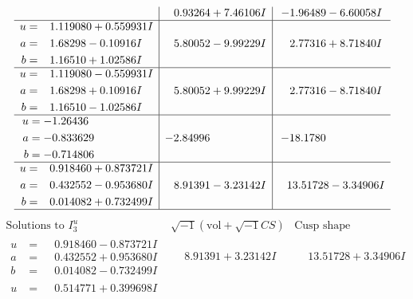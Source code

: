 \documentclass[1p]{elsarticle_modified}
\theoremstyle{definition}
\newcommand{\I}{\sqrt{-1}}
\begin{document}
$$\begin{array}{c|c|c}
 & \phantom{-}0.93264 + 7.46106 I & -1.96489 - 6.60058 I \\ \hline\begin{aligned}
u &= \phantom{-}1.119080 + 0.559931 I \\
a &= \phantom{-}1.68298 - 0.10916 I \\
b &= \phantom{-}1.16510 + 1.02586 I\end{aligned}
 & \phantom{-}5.80052 - 9.99229 I & \phantom{-}2.77316 + 8.71840 I \\ \hline\begin{aligned}
u &= \phantom{-}1.119080 - 0.559931 I \\
a &= \phantom{-}1.68298 + 0.10916 I \\
b &= \phantom{-}1.16510 - 1.02586 I\end{aligned}
 & \phantom{-}5.80052 + 9.99229 I & \phantom{-}2.77316 - 8.71840 I \\ \hline\begin{aligned}
u &= -1.26436\phantom{ +0.000000I} \\
a &= -0.833629\phantom{ +0.000000I} \\
b &= -0.714806\phantom{ +0.000000I}\end{aligned}
 & -2.84996\phantom{ +0.000000I} & -18.1780\phantom{ +0.000000I} \\ \hline\begin{aligned}
u &= \phantom{-}0.918460 + 0.873721 I \\
a &= \phantom{-}0.432552 - 0.953680 I \\
b &= \phantom{-}0.014082 + 0.732499 I\end{aligned}
 & \phantom{-}8.91391 - 3.23142 I & \phantom{-}13.51728 - 3.34906 I\\
 \hline 
 \end{array}$$\newpage$$\begin{array}{c|c|c}  
\text{Solutions to }I^u_{3}& \I (\text{vol} + \sqrt{-1}CS) & \text{Cusp shape}\\
 \hline 
\begin{aligned}
u &= \phantom{-}0.918460 - 0.873721 I \\
a &= \phantom{-}0.432552 + 0.953680 I \\
b &= \phantom{-}0.014082 - 0.732499 I\end{aligned}
 & \phantom{-}8.91391 + 3.23142 I & \phantom{-}13.51728 + 3.34906 I \\ \hline\begin{aligned}
u &= \phantom{-}0.514771 + 0.399698 I \\

\end{aligned}
\end{array}$$
\end{document}
